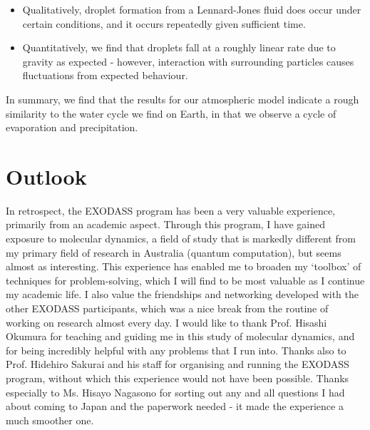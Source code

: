 \documentclass[a4paper,10pt]{article}
\begin{document}
\begin{itemize}
\item Qualitatively, droplet formation from a Lennard-Jones fluid does occur under certain conditions, and it occurs repeatedly given sufficient time.
\item Quantitatively, we find that droplets fall at a roughly linear rate due to gravity as expected - however, interaction with surrounding particles causes fluctuations from expected behaviour.
\end{itemize}

In summary, we find that the results for our atmospheric model indicate a rough similarity to the water cycle we find on Earth, in that we observe a cycle of evaporation and precipitation.





\section*{Outlook}

In retrospect, the EXODASS program has been a very valuable experience, primarily from an academic aspect. Through this program, I have gained exposure to molecular dynamics, a field of study that is markedly different from my primary field of research in Australia (quantum computation), but seems almost as interesting. This experience has enabled me to broaden my `toolbox' of techniques for problem-solving, which I will find to be most valuable as I continue my academic life. I also value the friendships and networking developed with the other EXODASS participants, which was a nice break from the routine of working on research almost every day. I would like to thank Prof. Hisashi Okumura for teaching and guiding me in this study of molecular dynamics, and for being incredibly helpful with any problems that I run into. Thanks also to Prof. Hidehiro Sakurai and his staff for organising and running the EXODASS program, without which this experience would not have been possible. Thanks especially to Ms. Hisayo Nagasono for sorting out any and all questions I had about coming to Japan and the paperwork needed - it made the experience a much smoother one.
\end{document}
